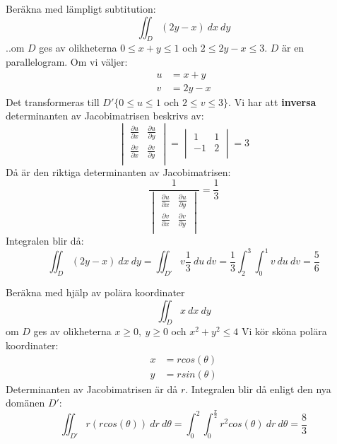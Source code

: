 \documentclass{report}
\begin{document}
\ex{}
{
Beräkna med lämpligt subtitution:
\begin{equation*}
\iint_{D}^{} (2y-x) \: dx   \: dy
\end{equation*}
..om $ D $ ges av olikheterna $ 0 \le  x+y \le 1 $ och $ 2 \le 2y-x \le 3 $. $ D $ är en parallelogram. Om vi väljer:
\begin{align*}
	u &= x+y\\
	v &= 2y-x
\end{align*}
	Det transformeras till $ D' \{ 0 \le u \le 1 $ och $ 2 \le v \le 3 \} $. Vi har att \textbf{inversa}  determinanten av Jacobimatrisen beskrivs av:
\begin{equation*}
\begin{vmatrix}
	\frac{\partial u }{\partial x}  & \frac{\partial u }{\partial y }  \\
	\frac{\partial v }{\partial x }  & \frac{\partial v }{\partial y }  \\
\end{vmatrix}
=
\begin{vmatrix}
		1 & 1 \\
	-1 & 2 \\
\end{vmatrix}
= 3
\end{equation*}
Då är den riktiga determinanten av Jacobimatrisen:
\begin{equation*}
\frac{1}{
\begin{vmatrix}
	\frac{\partial u  }{\partial x }  & \frac{\partial u  }{\partial y }  \\
	\frac{\partial v }{\partial x }  & \frac{\partial v }{\partial y }  \\
\end{vmatrix}
}
= \frac{1}{3} 
\end{equation*}
Integralen blir då:
\begin{equation*}
\iint_{D}^{} (2y-x) \: dx   \: dy = \iint_{D'}^{} v \frac{1}{3}  \: du   \: dv = \frac{1}{3} \int_{2}^{3} \int_{0}^{1} v \: du \: dv= \frac{5}{6}   
\end{equation*}
}

\pagebreak
\qs{}
{
Beräkna med hjälp av polära koordinater
\begin{equation*}
\iint_{D}^{} x \: dx   \: dy
\end{equation*}
om $ D $ ges av olikheterna $ x \ge 0, \: y \ge 0 $ och $ x^2+y^2 \le 4 $ 
}
\sol Vi kör sköna polära koordinater:
\begin{align*}
	x &= rcos(\theta)\\
	y &= rsin(\theta)
\end{align*}
Determinanten av Jacobimatrisen är då $ r $. Integralen blir då enligt den nya domänen $ D'$:
\begin{equation*}
\iint_{D'}^{} r(rcos(\theta) ) \: dr   \: d\theta = \int_{0}^{2} \int_{0}^{ \frac{\pi}{2} } r^2cos(\theta) \: dr  \: d\theta = \frac{8}{3}  
\end{equation*}
\end{document}
